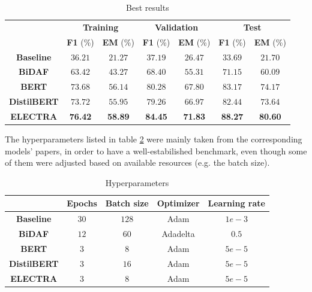 \documentclass[a4paper,10pt]{report}
\begin{document}
\begin{table}[h]
  \center
  \begin{tabular}{|c|c|c|c|c|c|c|}
    \hline
    \multirow{2}{*}{}   & \multicolumn{2}{c|}{\textbf{Training}} & \multicolumn{2}{c|}{\textbf{Validation}} & \multicolumn{2}{c|}{\textbf{Test}}                                                          \\ \cline{2-7}
                        & \textbf{F1} (\%) & \textbf{EM} (\%) & \textbf{F1} (\%) & \textbf{EM} (\%) & \textbf{F1} (\%) & \textbf{EM} (\%) \\ \hline
    \textbf{Baseline}   & $36.21$ & $21.27$ & $37.19$ & $26.47$ & $33.69$ & $21.70$ \\ \hline
    \textbf{BiDAF}      & $63.42$ & $43.27$ & $68.40$ & $55.31$ & $71.15$ & $60.09$ \\ \hline
    \textbf{BERT}       & $73.68$ & $56.14$ & $80.28$ & $67.80$ & $83.17$ & $74.17$ \\ \hline
    \textbf{DistilBERT} & $73.72$ & $55.95$ & $79.26$ & $66.97$ & $82.44$ & $73.64$ \\ \hline
    \textbf{ELECTRA}    & \textbf{76.42} & \textbf{58.89} & \textbf{84.45} & \textbf{71.83} & \textbf{88.27} & \textbf{80.60} \\ \hline
  \end{tabular}
  \caption{Best results}
  \label{table:results}
\end{table}

The hyperparameters listed in table \ref{table:hyperparameters} were mainly taken from the corresponding models' papers, in order to have a well-estabilished benchmark, even though some of them were adjusted based on available resources (e.g. the batch size).

\begin{table}[h]
  \center
  \begin{tabular}{|c|c|c|c|c|}
    \hline
                        & \textbf{Epochs} & \textbf{Batch size} & \textbf{Optimizer} & \textbf{Learning rate} \\ \hline
    \textbf{Baseline}   & $30$            & $128$               & Adam               & $1e-3$                 \\ \hline
    \textbf{BiDAF}      & $12$            & $60$                & Adadelta           & $0.5$                  \\ \hline
    \textbf{BERT}       & $3$             & $8$                 & Adam               & $5e-5$                 \\ \hline
    \textbf{DistilBERT} & $3$             & $16$                & Adam               & $5e-5$                 \\ \hline
    \textbf{ELECTRA}    & $3$             & $8$                 & Adam               & $5e-5$                 \\ \hline
  \end{tabular}
  \caption{Hyperparameters}
  \label{table:hyperparameters}
\end{table}
\end{document}

